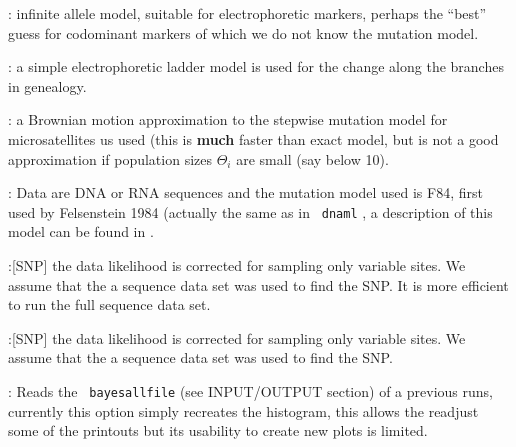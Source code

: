 \begin{description}
\item{:} infinite allele model, suitable for electrophoretic
markers, perhaps the ``best'' guess for 
codominant markers of which we do not know the mutation model.
\item{:} a simple electrophoretic ladder model is 
used for the change along the branches in genealogy.
\item{:} a Brownian motion approximation to 
the stepwise mutation
model for microsatellites us used (this is \textbf{ much} faster 
than exact model,
but is not a good approximation if population sizes $\Theta_i$ 
are small (say below 10).
\item{:} Data are DNA or RNA sequences and the mutation model used is F84, first used by Felsenstein 1984 (actually the same
as in \texttt{ dnaml} \citep[Phylip version 3.5; ][]{felsenstein:1993:ppia}, a description of this model 
can be found in \cite{swofford:1996:pi}. 
\item{:}[SNP] the data likelihood is corrected for 
sampling only variable sites. We assume that the a sequence data set
was used to find the SNP. It is more efficient to run the full sequence
data set.
\item{:}[SNP] the data likelihood is corrected for 
sampling only variable sites. We assume that the a sequence data set
was used to find the SNP. 
\item{:} Reads the \texttt{ bayesallfile}   (see INPUT/OUTPUT section) of a previous runs,
currently this option simply recreates the histogram, this allows the readjust some of the printouts but its usability to
create new plots is limited.
\end{description} 


